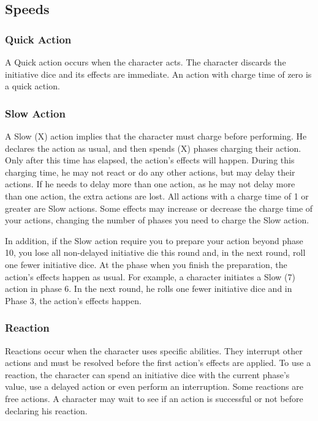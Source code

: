 \begin{multicols}{2}
\subsection{Speeds}\label{subsec:speeds}
\subsubsection{Quick Action}
A Quick action occurs when the character acts. The character discards the initiative dice and its effects are immediate. An action with charge time of zero is a quick action.

\subsubsection{Slow Action}
A Slow (X) action implies that the character must charge before performing. He declares the action as usual, and then spends (X) phases charging their action. Only after this time has elapsed, the action’s effects will happen. During this charging time, he may not react or do any other actions, but may delay their actions. If he needs to delay more than one action, as he may not delay more than one action, the extra actions are lost. All actions with a charge time of 1 or greater are Slow actions. Some effects may increase or decrease the charge time of your actions, changing the number of phases you need to charge the Slow action.

In addition, if the Slow action require you to prepare your action beyond phase 10, you lose all non-delayed initiative die this round and, in the next round, roll one fewer initiative dice. At the phase when you finish the preparation, the action’s effects happen as usual. For example, a character initiates a Slow (7) action in phase 6. In the next round, he rolls one fewer initiative dice and in Phase 3, the action’s effects happen.

\subsubsection{Reaction}
Reactions occur when the character uses specific abilities. They interrupt other actions and must be resolved before the first action’s effects are applied. To use a reaction, the character can spend an initiative dice with the current phase’s value, use a delayed action or even perform an interruption. Some reactions are free actions. A character may wait to see if an action is successful or not before declaring his reaction.


\end{multicols}
